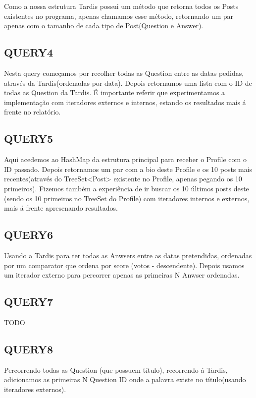 Como a nossa estrutura Tardis possui um método que retorna todos os Posts existentes no programa, apenas chamamos esse método,
retornando um par apenas com o tamanho de cada tipo de Post(Question e Answer).

\subsection{QUERY4}

Nesta query começamos por recolher todas as Question entre as datas pedidas, através da Tardis(ordenadas por data).
Depois retornamos uma lista com o ID de todas as Question da Tardis.
\newline
É importante referir que experimentamos a implementação com iteradores externos e internos, estando os resultados mais á frente
no relatório.

\subsection{QUERY5}

Aqui acedemos ao HashMap da estrutura principal para receber o Profile com o ID passado. Depois retornamos um par com a bio deste Profile e os
10 posts mais recentes(através do TreeSet<Post> existente no Profile, apenas pegando os 10 primeiros).
Fizemos também a experiência de ir buscar os 10 últimos posts deste (sendo os 10 primeiros no TreeSet do Profile) com
iteradores internos e externos, mais á frente apresenando resultados.

\subsection{QUERY6}

Usando a Tardis para ter todas as Anwsers entre as datas pretendidas, ordenadas por um comparator 
que ordena por score (votos - descendente). Depois usamos um iterador externo para percorrer apenas as primeiras N Anwser ordenadas.

\subsection{QUERY7}

TODO

\subsection{QUERY8}

Percorrendo todas as Question (que possuem título), recorrendo á Tardis, adicionamos as primeiras N Question ID onde a palavra
existe no título(usando iteradores externos).

